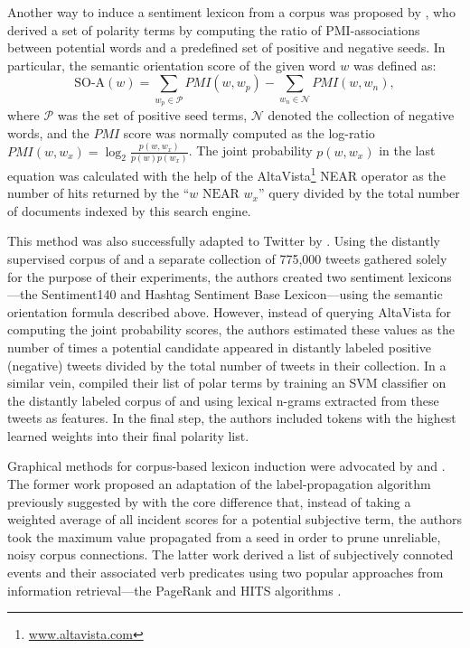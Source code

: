 Another way to induce a sentiment lexicon from a corpus was proposed
by \citet{Turney:03}, who derived a set of polarity terms by computing
the ratio of PMI-associations between potential words and a predefined
set of positive and negative seeds.  In particular, the semantic
orientation score of the given word $w$ was defined as:
\begin{equation*}
  \textrm{SO-A}(w) = \sum_{w_p\in\mathcal{P}}PMI(w, w_p) - \sum_{w_n\in\mathcal{N}}PMI(w, w_n),
\end{equation*}
where $\mathcal{P}$ was the set of positive seed terms, $\mathcal{N}$
denoted the collection of negative words, and the $PMI$ score was
normally computed as the log-ratio $PMI(w, w_x) = \log_2\frac{p(w,
  w_x)}{p(w)p(w_x)}$.  The joint probability $p(w, w_x)$ in the last
equation was calculated with the help of the
AltaVista\footnote{\url{www.altavista.com}} NEAR operator as the
number of hits returned by the ``$w\textrm{ NEAR }w_x$'' query divided
by the total number of documents indexed by this search engine.

This method was also successfully adapted to Twitter by
\citet{Kiritchenko:14}.  Using the distantly supervised corpus of
\citet{Go:09} and a separate collection of 775,000 tweets gathered
solely for the purpose of their experiments, the authors created two
sentiment lexicons---the Sentiment140 and Hashtag Sentiment Base
Lexicon---using the semantic orientation formula described above.
However, instead of querying AltaVista for computing the joint
probability scores, the authors estimated these values as the number
of times a potential candidate appeared in distantly labeled positive
(negative) tweets divided by the total number of tweets in their
collection.  In a similar vein, \citet{Severyn:15a} compiled their
list of polar terms by training an SVM classifier on the distantly
labeled corpus of \citet{Go:09} and using lexical n-grams extracted
from these tweets as features.  In the final step, the authors
included tokens with the highest learned weights into their final
polarity list.

Graphical methods for corpus-based lexicon induction were advocated by
\citet{Velikovich:10} and \citet{Feng:11}.  The former work proposed
an adaptation of the label-propagation algorithm previously suggested
by \citet{Rao:09} with the core difference that, instead of taking a
weighted average of all incident scores for a potential subjective
term, the authors took the maximum value propagated from a seed in
order to prune unreliable, noisy corpus connections.  The latter work
derived a list of subjectively connoted events and their associated
verb predicates using two popular approaches from information
retrieval---the PageRank \cite{Brin:98} and HITS algorithms
\cite{Kleinberg:99}.

